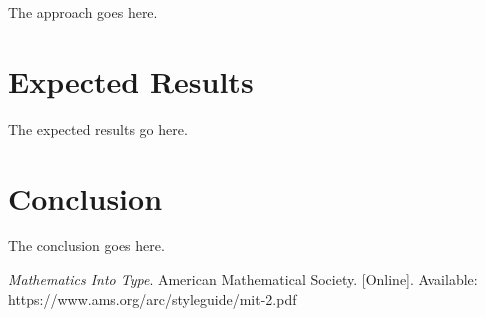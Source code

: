 \documentclass[journal,9pt]{IEEEtran}
\begin{document}
The approach goes here.

\section{Expected Results}

The expected results go here.

\section{Conclusion}

The conclusion goes here.

\begin{thebibliography}{1}
  

  {\it{Mathematics Into Type}}. American Mathematical Society. [Online]. Available: https://www.ams.org/arc/styleguide/mit-2.pdf

\end{thebibliography}

\vfill
\end{document}
